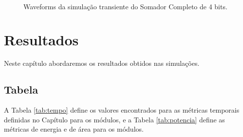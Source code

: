 \documentclass{iiufrgs}
\begin{document}
\begin{figure}[htbp]
    \centering
    \caption{Waveforms da simulação transiente do Somador Completo de 4 bits.}
    \label{fig:4bit_wave}
     \\
\end{figure}

\FloatBarrier

\chapter{Resultados}\label{resultados}
Neste capítulo abordaremos os resultados obtidos nas simulações.

\section{Tabela}\label{tabela}
A Tabela \ref{tab:tempo} define os valores encontrados para as métricas temporais definidas no Capítulo  para os módulos, e a Tabela \ref{tab:potencia} define as métricas de energia e de área para os módulos.
\end{document}
